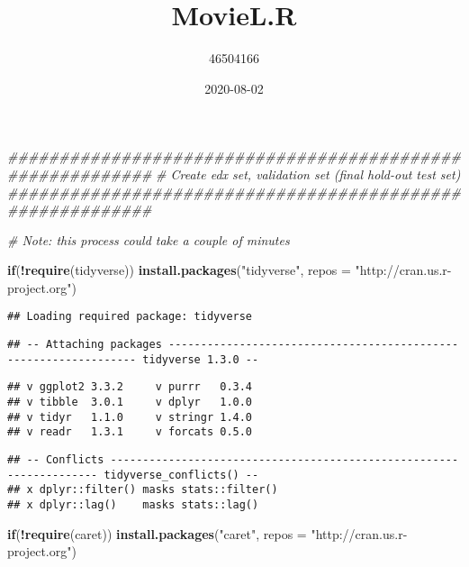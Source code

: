 \documentclass[
]{article}
\title{MovieL.R}
\author{46504166}
\date{2020-08-02}
\newenvironment{Shaded}{\begin{snugshade}}{\end{snugshade}}
\newcommand{\CommentTok}[1]{\textcolor[rgb]{0.56,0.35,0.01}{\textit{#1}}}
\newcommand{\ControlFlowTok}[1]{\textcolor[rgb]{0.13,0.29,0.53}{\textbf{#1}}}
\newcommand{\DataTypeTok}[1]{\textcolor[rgb]{0.13,0.29,0.53}{#1}}
\newcommand{\KeywordTok}[1]{\textcolor[rgb]{0.13,0.29,0.53}{\textbf{#1}}}
\newcommand{\NormalTok}[1]{#1}
\newcommand{\OperatorTok}[1]{\textcolor[rgb]{0.81,0.36,0.00}{\textbf{#1}}}
\newcommand{\StringTok}[1]{\textcolor[rgb]{0.31,0.60,0.02}{#1}}
\begin{document}
\maketitle

\begin{Shaded}
\begin{Highlighting}[]
\CommentTok{##########################################################}
\CommentTok{# Create edx set, validation set (final hold-out test set)}
\CommentTok{##########################################################}

\CommentTok{# Note: this process could take a couple of minutes}

\ControlFlowTok{if}\NormalTok{(}\OperatorTok{!}\KeywordTok{require}\NormalTok{(tidyverse)) }\KeywordTok{install.packages}\NormalTok{(}\StringTok{"tidyverse"}\NormalTok{, }\DataTypeTok{repos =} \StringTok{"http://cran.us.r-project.org"}\NormalTok{)}
\end{Highlighting}
\end{Shaded}

\begin{verbatim}
## Loading required package: tidyverse
\end{verbatim}

\begin{verbatim}
## -- Attaching packages ----------------------------------------------------------------- tidyverse 1.3.0 --
\end{verbatim}

\begin{verbatim}
## v ggplot2 3.3.2     v purrr   0.3.4
## v tibble  3.0.1     v dplyr   1.0.0
## v tidyr   1.1.0     v stringr 1.4.0
## v readr   1.3.1     v forcats 0.5.0
\end{verbatim}

\begin{verbatim}
## -- Conflicts -------------------------------------------------------------------- tidyverse_conflicts() --
## x dplyr::filter() masks stats::filter()
## x dplyr::lag()    masks stats::lag()
\end{verbatim}

\begin{Shaded}
\begin{Highlighting}[]
\ControlFlowTok{if}\NormalTok{(}\OperatorTok{!}\KeywordTok{require}\NormalTok{(caret)) }\KeywordTok{install.packages}\NormalTok{(}\StringTok{"caret"}\NormalTok{, }\DataTypeTok{repos =} \StringTok{"http://cran.us.r-project.org"}\NormalTok{)}
\end{Highlighting}
\end{Shaded}
\end{document}
